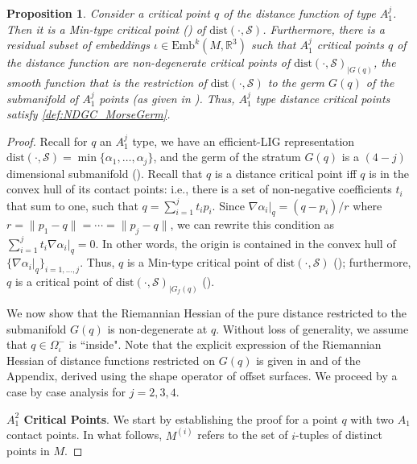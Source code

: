 \documentclass[11pt]{article}
\newcommand{\R}{\mathbb{R}}
\newcommand{\io}{\iota}
\newcommand{\W}{\Omega}
\newcommand{\Emb}{\mathrm{Emb}^k(M,\R^3)}
\newcommand{\dist}{\mathrm{dist}}
\newcommand{\Surf}{\mathcal{S}}
\theoremstyle{plain}
\newtheorem{prop}{Proposition}
\theoremstyle{definition}
\theoremstyle{remark}
\begin{document}
\begin{prop} \label{prop:A1Morse} Consider a critical point $q$ of the distance function of type $A_1^j$. Then it is a Min-type critical point  () of $\dist(\cdot, \Surf)$.  Furthermore, there is a residual subset of embeddings $\io \in \Emb$ such that $A_1^j$ critical points $q$ of the distance function are non-degenerate critical points of $\dist(\cdot, \Surf)_{\rvert G(q)}$, the smooth function that is the restriction of $\dist(\cdot, \Surf)$ to the germ $G(q)$ of the submanifold of $A_1^j$ points (as given in ). Thus, $A_1^j$ type distance critical points satisfy \ref{def:NDGC_MorseGerm}.
\end{prop}
\begin{proof}
Recall for $q$ an $A_1^j$ type, we have an efficient-LIG representation $\dist(\cdot, \Surf) = \min\{\alpha_1, \ldots, \alpha_j\}$, and the germ of the stratum $G(q)$ is a $(4-j)$ dimensional submanifold (). Recall  that $q$ is a distance critical point iff $q$ is in the convex hull of its contact points: i.e., there is a set of non-negative coefficients $t_i$ that sum to one, such that $q = \sum_{i=1}^j t_i p_i$. Since $\nabla \alpha_i \rvert_{q} = (q-p_i)/r$ where $r = \|p_1 - q \| = \cdots = \|p_j - q \|$, we can rewrite this condition as $\sum_{i=1}^j t_i \nabla \alpha_i \rvert_{q} = 0$. In other words, the origin is contained in the convex hull of $\{ \nabla \alpha_i\rvert_q\}_{i = 1,\ldots,j}$. Thus, $q$ is a Min-type critical point of $\dist(\cdot, \Surf)$ (); furthermore, $q$ is a critical point of  $\dist(\cdot, \Surf)_{\lvert G_f(q)}$ (). 
 
We now show that the Riemannian Hessian of the pure distance restricted to the submanifold $G(q)$ is non-degenerate at $q$. 
Without loss of generality, we assume that $q \in \W_\io^-$ is ``inside".
Note that the explicit expression of the Riemannian Hessian of distance functions restricted on $G(q)$ is given in   and  of the Appendix, derived using the shape operator of offset surfaces. We proceed by a case by case analysis for $j = 2,3,4$. 


\textbf{$A_1^2$ Critical Points}. We start by establishing the proof for a point $q$ with two $A_1$ contact points. In what follows, $M^{(i)}$ refers to the set of $i$-tuples of distinct points in $M$.


\end{proof}
\end{document}
